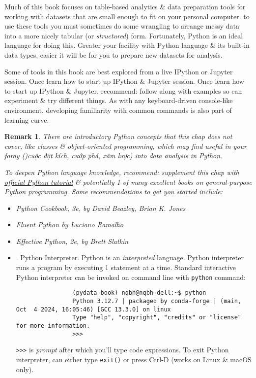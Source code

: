 \documentclass{article}
\newtheorem{remark}{Remark}
\begin{document}
\begin{enumerate}
\begin{itemize}
		Much of this book focuses on table-based analytics \& data preparation tools for working with datasets that are small enough to fit on your personal computer. to use these tools you must sometimes do some wrangling to arrange messy data into a more nicely tabular (or {\it structured}) form. Fortunately, Python is an ideal language for doing this. Greater your facility with Python language \& its built-in data types, easier it will be for you to prepare new datasets for analysis.
		
		Some of tools in this book are best explored from a live IPython or Jupyter session. Once learn how to start up IPython \& Jupyter session. Once learn how to start up IPython \& Jupyter, recommend: follow along with examples so can experiment \& try different things. As with any keyboard-driven console-like environment, developing familiarity with common commands is also part of learning curve.		
		\begin{remark}
			There are introductory Python concepts that this chap does not cover, like classes \& object-oriented programming, which may find useful in your foray ()cuộc đột kích, cướp phá, xâm lược) into data analysis in Python.
			
			To deepen Python language knowledge, recommend: supplement this chap with \href{http://docs.python.org}{official Python tutorial} \& potentially 1 of many excellent books on general-purpose Python programming. Some recommendations to get you started include:
			\begin{itemize}
				\item {\it Python Cookbook}, 3e, by {\sc David Beazley, Brian K. Jones}
				\item {\it Fluent Python} by {\sc Luciano Ramalho}
				\item {\it Effective Python}, 2e, by {\sc Brett Slatkin}
			\end{itemize}
		\end{remark}
		
		\begin{itemize}
			\item {. Python Interpreter.} Python is an {\it interpreted} language. Python interpreter runs a program by executing 1 statement at a time. Standard interactive Python interpreter can be invoked on command line with {\tt python} command:
			\begin{verbatim}
				(pydata-book) nqbh@nqbh-dell:~$ python
				Python 3.12.7 | packaged by conda-forge | (main, Oct  4 2024, 16:05:46) [GCC 13.3.0] on linux                                                        
				Type "help", "copyright", "credits" or "license" for more information.            
				>>>
			\end{verbatim}
			{\tt>>>} is {\it prompt} after which you'll type code expressions. To exit Python interpreter, can either type {\tt exit()} or press Ctrl-D (works on Linux \& macOS only).
			

\end{itemize}
\end{itemize}
\end{enumerate}
\end{document}
